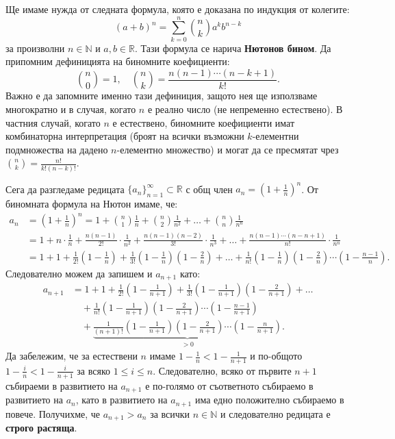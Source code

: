 Ще имаме нужда от следната формула, която е доказана по индукция от колегите:
\[
(a + b)^n = \sum_{k=0}^n \binom{n}{k} a^k b^{n-k}
\]
за произволни $n \in \mathbb{N}$ и $a, b \in \mathbb{R}$. Тази формула се нарича \textbf{Нютонов бином}. Да припомним дефиницията на биномните коефициенти:
\[
\binom{n}{0} = 1, \quad \binom{n}{k} = \frac{n(n - 1)\cdots(n - k + 1)}{k!}.
\]
Важно е да запомните именно тази дефиниция, защото нея ще използваме многократно и в случая, когато $n$ е реално число (не непременно естествено). В частния случай, когато $n$ е естествено, биномните коефициенти имат комбинаторна интерпретация (броят на всички възможни $k$-елементни подмножества на дадено $n$-елементно множество) и могат да се пресмятат чрез $\binom{n}{k} = \frac{n!}{k!(n-k)!}$.

Сега да разгледаме редицата $\{a_n\}_{n=1}^{\infty} \subset \mathbb{R}$ с общ член $a_n = \left(1 + \frac{1}{n}\right)^n$. От биномната формула на Нютон имаме, че:
\begin{align*}
a_n &= \left(1 + \frac{1}{n}\right)^n = 1 + \binom{n}{1}\frac{1}{n} + \binom{n}{2}\frac{1}{n^2} + \dots + \binom{n}{n}\frac{1}{n^n} \\
&= 1 + n \cdot \frac{1}{n} + \frac{n(n - 1)}{2!} \cdot \frac{1}{n^2} + \frac{n(n - 1)(n - 2)}{3!} \cdot \frac{1}{n^3} + \dots + \frac{n(n - 1)\cdots(n - n + 1)}{n!} \cdot \frac{1}{n^n} \\
&= 1 + 1 + \frac{1}{2!}\left(1 - \frac{1}{n}\right) + \frac{1}{3!}\left(1 - \frac{1}{n}\right)\left(1 - \frac{2}{n}\right) + \dots + \frac{1}{n!}\left(1 - \frac{1}{n}\right)\left(1 - \frac{2}{n}\right)\cdots\left(1 - \frac{n - 1}{n}\right).
\end{align*}
Следователно можем да запишем и $a_{n+1}$ като:
\begin{align*}
a_{n+1} &= 1 + 1 + \frac{1}{2!}\left(1 - \frac{1}{n + 1}\right) + \frac{1}{3!}\left(1 - \frac{1}{n + 1}\right)\left(1 - \frac{2}{n + 1}\right) + \dots \\
&\quad + \frac{1}{n!}\left(1 - \frac{1}{n + 1}\right)\left(1 - \frac{2}{n + 1}\right)\cdots\left(1 - \frac{n - 1}{n + 1}\right) \\
&\quad + \underbrace{\frac{1}{(n + 1)!}\left(1 - \frac{1}{n + 1}\right)\left(1 - \frac{2}{n + 1}\right)\cdots\left(1 - \frac{n}{n + 1}\right)}_{> 0}.
\end{align*}
Да забележим, че за естествени $n$ имаме $1 - \frac{1}{n} < 1 - \frac{1}{n+1}$ и по-общото $1 - \frac{i}{n} < 1 - \frac{i}{n+1}$ за всяко $1 \le i \le n$. Следователно, всяко от първите $n + 1$ събираеми в развитието на $a_{n+1}$ е по-голямо от съответното събираемо в развитието на $a_n$, като в развитието на $a_{n+1}$ има едно положително събираемо в повече. Получихме, че $a_{n+1} > a_n$ за всички $n \in \mathbb{N}$ и следователно редицата е \textbf{строго растяща}.

